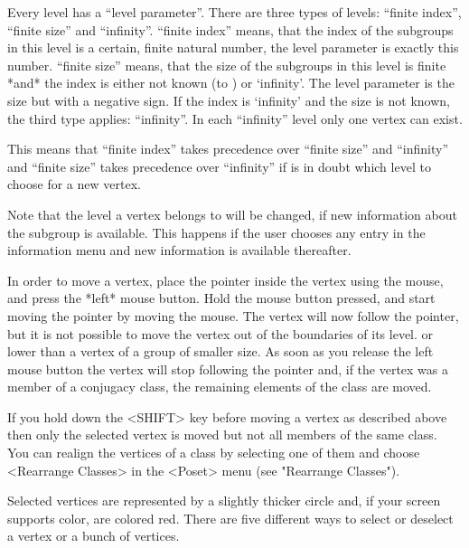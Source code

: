 Every level has a ``level parameter''.
There are three types of levels: ``finite index'', ``finite size'' and 
``infinity''. ``finite index'' means, that the index of the subgroups
in this level is a certain, finite natural number, the level parameter 
is exactly this number. ``finite size'' means, that the size of the
subgroups in this level is finite *and* the index is either not known
(to {\GAP}) or `infinity'. The level parameter is the size but with a
negative sign. If the index is `infinity' and the size is
not known, the third type applies: ``infinity''. In each ``infinity''
level only one vertex can exist.

This means that ``finite index'' takes precedence over ``finite size'' 
and ``infinity'' and ``finite size'' takes precedence over
``infinity'' if {\XGAP} is in doubt which level to choose for a new
vertex. 

Note that the level a vertex belongs to will be changed, if new
information about the subgroup is available. This happens if the user
chooses any entry in the information menu and new information is
available thereafter.



In order to move a vertex, place the  pointer inside the vertex using the
mouse, and press the *left* mouse button.  Hold the mouse button pressed,
and start moving  the pointer by moving  the mouse.  The  vertex will now
follow the pointer, but it is not possible to move the vertex out of
the boundaries of its level.
or lower than a vertex of a group of smaller
size.
As soon as you release the left mouse
button the vertex will stop following the pointer  and, if the vertex was
a member of a  conjugacy class, the remaining elements  of the class  are
moved.

If you hold  down  the <SHIFT> key before  moving  a vertex as  described
above then  only the selected vertex is moved but not all members of the
same class. You can realign the vertices of a class by selecting one of
them and choose <Rearrange Classes> in the <Poset> menu 
(see "Rearrange Classes").


Selected vertices are represented by a slightly thicker circle and, if
your screen supports color, are colored red.  There are five different
ways to select or deselect a vertex or a bunch of vertices.

